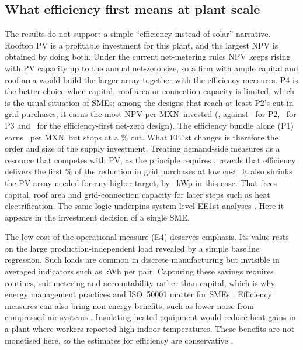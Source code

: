 \documentclass[preprint,12pt,authoryear]{elsarticle}
\newcommand{\MXN}{MXN}
\begin{document}
\subsection{What efficiency first means at plant scale}
The results do not support a simple ``efficiency instead of solar'' narrative. Rooftop PV is a profitable investment for this plant, and the largest NPV is obtained by doing both. Under the current net-metering rules NPV keeps rising with PV capacity up to the annual net-zero size, so a firm with ample capital and roof area would build the larger array together with the efficiency measures. P4 is the better choice when capital, roof area or connection capacity is limited, which is the usual situation of SMEs: among the designs that reach at least P2's cut in grid purchases, it earns the most NPV per \MXN\ invested (\nNPVCapexFour, against \nNPVCapexTwo\ for P2, \nNPVCapexThree\ for P3 and \nNPVCapexNZE\ for the efficiency-first net-zero design). The efficiency bundle alone (P1) earns \nNPVCapexOne\ per \MXN\ but stops at a \nEESavedPct\% cut. What EE1st changes is therefore the order and size of the supply investment. Treating demand-side measures as a resource that competes with PV, as the principle requires \citep{mandel2022,ec2021ee1st}, reveals that efficiency delivers the first \nEESavedPct\% of the reduction in grid purchases at low cost. It also shrinks the PV array needed for any higher target, by \nPVDiffFour~kWp in this case. That frees capital, roof area and grid-connection capacity for later steps such as heat electrification. The same logic underpins system-level EE1st analyses \citep{mandel2023,pato2022}. Here it appears in the investment decision of a single SME.

The low cost of the operational measure (E4) deserves emphasis. Its value rests on the large production-independent load revealed by a simple baseline regression. Such loads are common in discrete manufacturing \citep{kara2011,mouzon2007} but invisible in averaged indicators such as kWh per pair. Capturing these savings requires routines, sub-metering and accountability rather than capital, which is why energy management practices and ISO~50001 matter for SMEs \citep{thollander2025,mckane2017}. Efficiency measures can also bring non-energy benefits, such as lower noise from compressed-air systems \citep{nehler2018}. Insulating heated equipment would reduce heat gains in a plant where workers reported high indoor temperatures. These benefits are not monetised here, so the estimates for efficiency are conservative \citep{worrell2003,nehler2016}.
\end{document}
